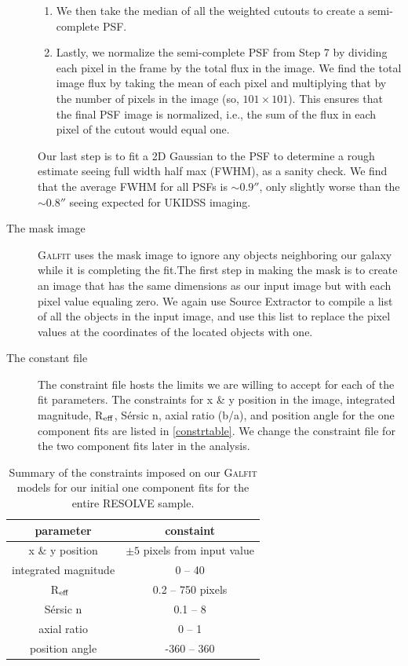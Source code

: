 \documentclass[iop,apj]{emulateapj}
\newcommand{\Reff}{R$_{\rm eff}$}
\begin{document}
\begin{description}
{\begin{enumerate}
\item We then take the median of all the weighted cutouts to create a semi-complete PSF.

\item Lastly, we normalize the semi-complete PSF from Step 7 by dividing each pixel in the frame by the total flux in the image. We find the total image flux by taking the mean of each pixel and multiplying that by the number of pixels in the image (so, $101\times101$). This ensures that the final PSF image is normalized, i.e., the sum of the flux in each pixel of the cutout would equal one.    

\end{enumerate}

\noindent Our last step is to fit a 2D Gaussian to the PSF to determine a rough estimate seeing full width half max (FWHM), as a sanity check. We find that the average FWHM for all PSFs is $\sim 0.9''$, only slightly worse than the $\sim 0.8''$ seeing expected for UKIDSS imaging.}

\item[The mask image]{\textsc{Galfit} uses the mask image to ignore any objects neighboring our galaxy while it is completing the fit.The first step in making the mask is to create an image that has the same dimensions as our input image but with each pixel value equaling zero. We again use Source Extractor to compile a list of all the objects in the input image, and  use this list to replace the pixel values at the coordinates of the located objects with one.}

\item[The constant file]{The constraint file hosts the limits we are willing to accept for each of the fit parameters. The constraints for x \& y position in the image, integrated magnitude, \Reff, S\'ersic n, axial ratio (b/a), and position angle for the one component fits are listed in \autoref{constrtable}. We change the constraint file for the two component fits later in the analysis.}

\end{description}

\begin{table}[htdp]
\begin{center}
\begin{tabular}{cc} \hline
parameter & constaint  \\ \hline
x \& y position & $\pm5$ pixels from input value \\
integrated magnitude & 0 -- 40 \\ 
\Reff\ & 0.2 -- 750 pixels \\ 
S\'ersic n & 0.1 -- 8 \\ 
axial ratio & 0 -- 1 \\
position angle & -360 -- 360 \\ \hline
\end{tabular}
\end{center}
\caption{Summary of the constraints imposed on our \textsc{Galfit} models for our initial one component fits for the entire RESOLVE sample.}
\label{constrtable}
\end{table}%
\end{document}
